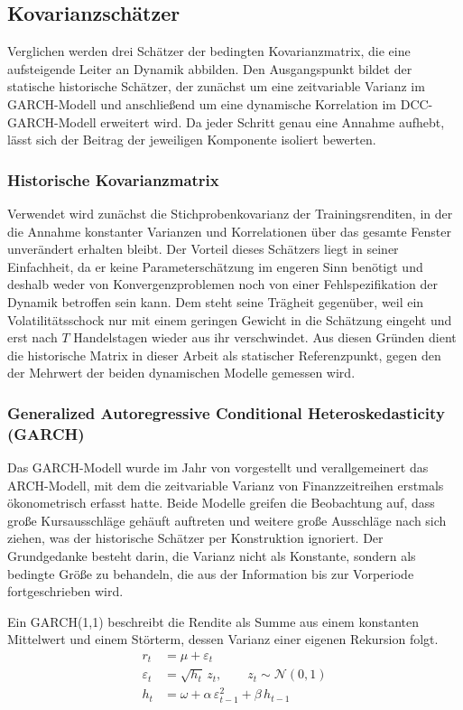 \documentclass[a4paper, 12pt]{article}
\begin{document}
\subsection{Kovarianzschätzer}\label{subsec:kovarianz}
Verglichen werden drei Schätzer der bedingten Kovarianzmatrix, die eine aufsteigende Leiter an Dynamik abbilden.
Den Ausgangspunkt bildet der statische historische Schätzer, der zunächst um eine zeitvariable Varianz im GARCH-Modell und anschließend um eine dynamische Korrelation im DCC-GARCH-Modell erweitert wird.
Da jeder Schritt genau eine Annahme aufhebt, lässt sich der Beitrag der jeweiligen Komponente isoliert bewerten.

\subsubsection{Historische Kovarianzmatrix}
Verwendet wird zunächst die Stichprobenkovarianz der Trainingsrenditen, in der die Annahme konstanter Varianzen und Korrelationen über das gesamte Fenster unverändert erhalten bleibt.
Der Vorteil dieses Schätzers liegt in seiner Einfachheit, da er keine Parameterschätzung im engeren Sinn benötigt und deshalb weder von Konvergenzproblemen noch von einer Fehlspezifikation der Dynamik betroffen sein kann.
Dem steht seine Trägheit gegenüber, weil ein Volatilitätsschock nur mit einem geringen Gewicht in die Schätzung eingeht und erst nach $T$ Handelstagen wieder aus ihr verschwindet.
Aus diesen Gründen dient die historische Matrix in dieser Arbeit als statischer Referenzpunkt, gegen den der Mehrwert der beiden dynamischen Modelle gemessen wird.

\subsubsection{Generalized Autoregressive Conditional Heteroskedasticity (GARCH)}
Das GARCH-Modell wurde im Jahr \citeyear{bollerslev1986} von \citeauthor{bollerslev1986} vorgestellt und verallgemeinert das ARCH-Modell, mit dem \textcite{engle1982} die zeitvariable Varianz von Finanzzeitreihen erstmals ökonometrisch erfasst hatte.
Beide Modelle greifen die Beobachtung auf, dass große Kursausschläge gehäuft auftreten und weitere große Ausschläge nach sich ziehen, was der historische Schätzer per Konstruktion ignoriert.
Der Grundgedanke besteht darin, die Varianz nicht als Konstante, sondern als bedingte Größe zu behandeln, die aus der Information bis zur Vorperiode fortgeschrieben wird.

Ein GARCH(1,1) beschreibt die Rendite als Summe aus einem konstanten Mittelwert und einem Störterm, dessen Varianz einer eigenen Rekursion folgt.
\begin{align}
	\label{eq:garch-1}
	r_t &= \mu + \varepsilon_t \\
	\label{eq:garch-2}
	\varepsilon_t &= \sqrt{h_t}\,z_t, \qquad z_t \sim \mathcal{N}(0,1) \\
	\label{eq:garch-3}
	h_t &= \omega + \alpha\,\varepsilon_{t-1}^2 + \beta\,h_{t-1}
\end{align}
\end{document}

